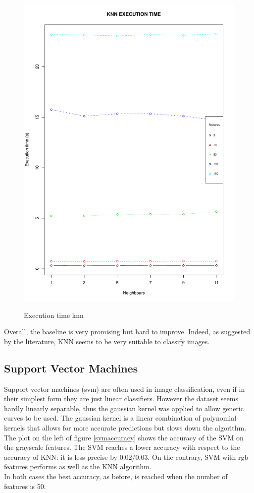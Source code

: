 \documentclass{article}
\begin{document}
\begin{figure}[H]
\begin{adjustwidth}{-4cm}{-4cm}
{    \includegraphics[scale=0.3]{../knn_time_rgb.pdf}  
     }
     \centering
     \caption{Execution time knn}
      \end{adjustwidth}
   \end{figure}
   
\noindent Overall, the baseline is very promising but hard to improve. Indeed, as suggested by the literature, KNN seems to be very suitable to classify images.

\subsection{Support Vector Machines}
Support vector machines (svm) are often used in image classification, even if in their simplest form they are just linear classifiers. However the dataset seems  hardly linearly separable, thus the gaussian kernel was applied to allow generic curves to be used. The gaussian kernel is a linear combination of polynomial kernels that allows for more accurate predictions but slows down the algorithm.\\
The plot on the left of figure \ref{svmaccuracy} shows the accuracy of the SVM on the grayscale features. The SVM reaches a lower accuracy with respect to the accuracy of KNN: it is less precise by 0.02/0.03. On the contrary, SVM with rgb features performs as well as the KNN algorithm.\\
In both cases the best accuracy, as before, is reached when the number of features is 50.
\end{document}
